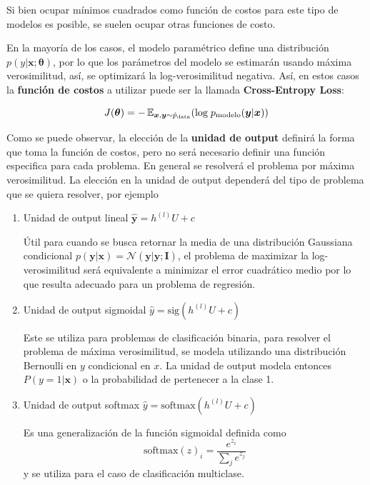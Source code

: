 Si bien ocupar mínimos cuadrados como función de costos para este tipo de modelos es posible, se suelen ocupar otras funciones de costo. 

En la mayor\'ia de los casos, el modelo param\'etrico define una distribuci\'on $p(y|\bm{x}; \bm{\theta})$, por lo que los par\'ametros del modelo se estimar\'an usando m\'axima verosimilitud, as\'i, se optimizar\'a la log-verosimilitud negativa. Así, en estos casos la \textbf{funci\'on de costos} a utilizar puede ser la llamada \textbf{Cross-Entropy Loss}:

\begin{equation}
J(\bm{\theta}) = -\operatorname{\mathbb{E}}_{\bm{x},\bm{y}\sim \hat{p}_{\textrm{data}}}(\textrm{log}\; p_{\textrm{modelo}}(\bm{y}|\bm{x}))
\end{equation}

Como se puede observar,  la elecci\'on de la \textbf{unidad de output} definir\'a la forma que toma la funci\'on de costos, pero no ser\'a necesario definir una funci\'on especifica para cada problema. En general se resolver\'a el problema por m\'axima verosimilitud. La elecci\'on en la unidad de output depender\'a del tipo de problema que se quiera resolver, por ejemplo

\begin{enumerate}
  \item Unidad de output lineal $\hat{\bm{y}} = h^{(l)}U + c$ 

  Útil para cuando se busca retornar la media de una distribución Gaussiana condicional $p(\bm{y}|\bm{x}) = \mathcal{N}(\bm{y}|\hat{\bm{y}};\bm{I})$, el problema de maximizar la log-verosimilitud será equivalente a minimizar el error cuadrático medio por lo que resulta adecuado para un problema de regresión.

  \item Unidad de output sigmoidal $\hat{{y}} = \text{sig}(h^{(l)}U + c)$ 

  Este se utiliza para problemas de clasificación binaria, para resolver el problema de máxima verosimilitud, se modela utilizando una distribución Bernoulli en $y$ condicional en $x$. La unidad de output modela entonces $P(y=1|\bm{x})$ o la probabilidad de pertenecer a la clase 1.
   

  \item Unidad de output softmax $\hat{{y}} = \text{softmax}(h^{(l)}U + c)$  

  Es una generalización de la función sigmoidal definida como 
  \begin{equation*}
  \text{softmax}(z)_i = \frac{e^{z_i}}{\sum_{j}e^{z_j}}
  \end{equation*}
  y se utiliza para el caso de clasificación multiclase. 
\end{enumerate}



